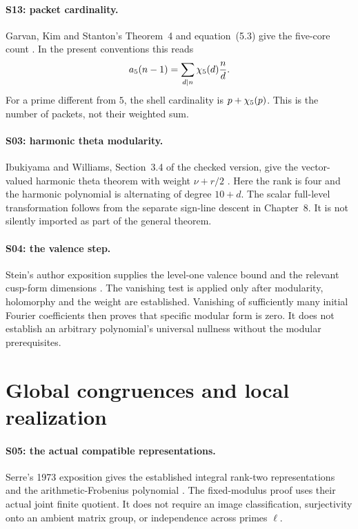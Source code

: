 \paragraph{S13: packet cardinality.}
Garvan, Kim and Stanton's Theorem~4 and equation~(5.3) give the five-core count \cite{GKS}. In the present conventions this reads
\[
a_5(n-1)=\sum_{d\mid n}\chi_5(d)\frac nd.
\]
For a prime different from $5$, the shell cardinality is $p+\chi_5(p)$. This is the number of packets, not their weighted sum.

\paragraph{S03: harmonic theta modularity.}
Ibukiyama and Williams, Section~3.4 of the checked version, give the vector-valued harmonic theta theorem with weight $\nu+r/2$ \cite{IW}. Here the rank is four and the harmonic polynomial is alternating of degree $10+d$. The scalar full-level transformation follows from the separate sign-line descent in Chapter~8. It is not silently imported as part of the general theorem.

\paragraph{S04: the valence step.}
Stein's author exposition supplies the level-one valence bound and the relevant cusp-form dimensions \cite{Stein}. The vanishing test is applied only after modularity, holomorphy and the weight are established. Vanishing of sufficiently many initial Fourier coefficients then proves that specific modular form is zero. It does not establish an arbitrary polynomial's universal nullness without the modular prerequisites.

\section{Global congruences and local realization}
\paragraph{S05: the actual compatible representations.}
Serre's 1973 exposition gives the established integral rank-two representations and the arithmetic-Frobenius polynomial \cite{SerreBourbaki}. The fixed-modulus proof uses their actual joint finite quotient. It does not require an image classification, surjectivity onto an ambient matrix group, or independence across primes $\ell$.

